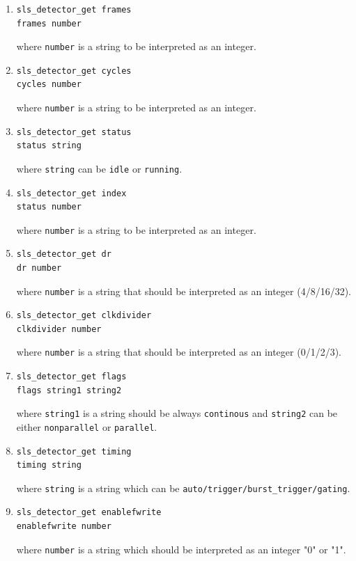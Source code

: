 \documentclass{article}
\begin{document}
\begin{enumerate}
\item \begin{verbatim}
sls_detector_get frames
frames number 
\end{verbatim}
where {\tt{number}} is a string to be interpreted as an integer.

\item \begin{verbatim}
sls_detector_get cycles
cycles number 
\end{verbatim}
where {\tt{number}} is a string to be interpreted as an integer.

\item \begin{verbatim}
sls_detector_get status
status string 
\end{verbatim}
where {\tt{string}} can be {\tt{idle}} or {\tt{running}}.

\item \begin{verbatim}
sls_detector_get index
status number
\end{verbatim}
where {\tt{number}} is a string to be interpreted as an integer.

\item \begin{verbatim}
sls_detector_get dr
dr number
\end{verbatim}
where {\tt{number}} is a string that should be interpreted as an integer (4/8/16/32).

\item \begin{verbatim}
sls_detector_get clkdivider
clkdivider number
\end{verbatim}
where {\tt{number}} is a string that should be interpreted as an integer (0/1/2/3).

\item \begin{verbatim}
sls_detector_get flags
flags string1 string2 
\end{verbatim}
where {\tt{string1}} is a string should be always {\tt{continous}} and {\tt{string2}} can be either {\tt{nonparallel}} or {\tt{parallel}}.

\item \begin{verbatim}
sls_detector_get timing 
timing string
\end{verbatim}
where {\tt{string}} is a string which can be {\tt{auto/trigger/burst\_trigger/gating}}.

\item \begin{verbatim}
sls_detector_get enablefwrite
enablefwrite number
\end{verbatim}
where {\tt{number}} is a string which should be interpreted as an integer "0" or "1".


\end{enumerate}
\end{document}
